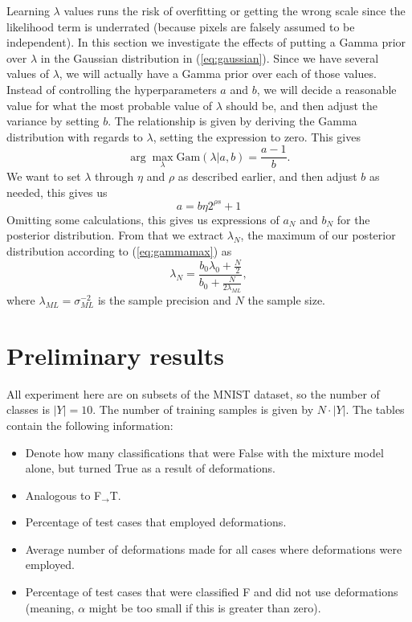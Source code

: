\documentclass{article}
\begin{document}
Learning $\lambda$ values runs the risk of overfitting or getting the wrong scale since the likelihood term is underrated (because pixels are falsely assumed to be independent). In this section we investigate the effects of putting a Gamma prior over $\lambda$ in the Gaussian distribution in (\ref{eq:gaussian}). Since we have several values of $\lambda$, we will actually have a Gamma prior over each of those values. Instead of controlling the hyperparameters $a$ and $b$, we will decide a reasonable value for what the most probable value of $\lambda$ should be, and then adjust the variance by setting $b$. The relationship is given by deriving the Gamma distribution with regards to $\lambda$, setting the expression to zero. This gives
\begin{equation} \label{eq:gammamax}
    \arg\max_{\lambda} \text{Gam}(\lambda|a, b) = \frac{a-1}{b}.
\end{equation}
We want to set $\lambda$ through $\eta$ and $\rho$ as described earlier, and then adjust $b$ as needed, this gives us
\[
    a = b \eta 2^{\rho s} + 1
\]
Omitting some calculations, this gives us expressions of $a_N$ and $b_N$ for the posterior distribution. From that we extract $\lambda_N$, the maximum of our posterior distribution according to (\ref{eq:gammamax}) as
\[
    \lambda_N = \frac{b_0 \lambda_0 + \frac{N}{2}}{b_0 + \frac{N}{2 \lambda_{ML}}},
\]
where $\lambda_{ML} = \sigma_{ML}^{-2}$ is the sample precision and $N$ the sample size.

\newcommand{\FT}{F$_\rightarrow $T}
\newcommand{\TF}{T$_\rightarrow $F}

\section{Preliminary results}
All experiment here are on subsets of the MNIST dataset, so the number of classes is $|Y| = 10$. The number of training samples is given by $N \cdot |Y|$. The tables contain the following information:
\begin{itemize}
    \item[\textbf{\FT}] Denote how many classifications that were False with the mixture model alone, but turned True as a result of deformations.
    \item[\textbf{\TF}] Analogous to \FT.
    \item[\textbf{Deformed}] Percentage of test cases that employed deformations. 
    \item[\textbf{\#cont.}] Average number of deformations made for all cases where deformations were employed.
    \item[\textbf{F undef.}] Percentage of test cases that were classified F and did not use deformations (meaning, $\alpha$ might be too small if this is greater than zero).
\end{itemize}
\end{document}
